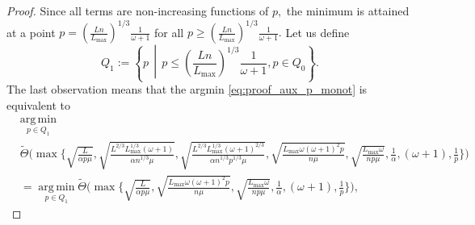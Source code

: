 \documentclass{article} %
\theoremstyle{plain}
\theoremstyle{definition}
\theoremstyle{remark}
\newcommand{\eqdef}{:=}
\DeclareMathOperator*{\argmin}{arg\,min}%
\begin{document}
\begin{proof}
  Since all terms are non-increasing functions of $p,$ the minimum is attained at a point $p = \left(\frac{L n}{L_{\max}}\right)^{1/3} \frac{1}{\omega + 1}$ for all $p \geq \left(\frac{L n}{L_{\max}}\right)^{1/3} \frac{1}{\omega + 1}.$ Let us define $$Q_1 \eqdef \left\{p\,\middle|\, p \leq \left(\frac{L n}{L_{\max}}\right)^{1/3} \frac{1}{\omega + 1}, p \in Q_0\right\}.$$ The last observation means that the argmin \eqref{eq:proof_aux_p_monot} is equivalent to
  \begin{align}
    &\argmin\limits_{p \in Q_1} \nonumber\\
    &\widetilde{\Theta}\Bigg(\max\Bigg\{\sqrt{\frac{L}{\alpha p \mu}},\sqrt{\frac{L^{2/3} L_{\max}^{1/3} (\omega + 1)}{\alpha n^{1/3} \mu}}, \sqrt{\frac{L^{2/3} L_{\max}^{1/3} (\omega + 1)^{2/3}}{\alpha n^{1/3} p^{1/3} \mu}}, \sqrt{\frac{L_{\max} \omega (\omega + 1)^2 p}{n \mu}}, \sqrt{\frac{L_{\max} \omega}{n p \mu}}, \frac{1}{\alpha}, (\omega + 1), \frac{1}{p}\Bigg\}\Bigg) \nonumber\\
    &=\argmin\limits_{p \in Q_1} \widetilde{\Theta}\Bigg(\max\Bigg\{\sqrt{\frac{L}{\alpha p \mu}}, \sqrt{\frac{L_{\max} \omega (\omega + 1)^2 p}{n \mu}}, \sqrt{\frac{L_{\max} \omega}{n p \mu}}, \frac{1}{\alpha}, (\omega + 1), \frac{1}{p}\Bigg\}\Bigg), \label{eq:argmin_max_p}
  \end{align}


\end{proof}
\end{document}
